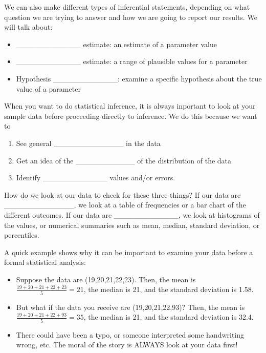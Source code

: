 \documentclass[]{book}
\providecommand{\tightlist}{%
  \setlength{\itemsep}{0pt}\setlength{\parskip}{0pt}}
\theoremstyle{definition}
\theoremstyle{definition}
\theoremstyle{remark}
\begin{document}
We can also make different types of inferential statements, depending on
what question we are trying to answer and how we are going to report our
results. We will talk about:

\begin{itemize}
\tightlist
\item
  \_\_\_\_\_\_\_\_\_\_\_\_ estimate: an estimate of a parameter value
  \vspace{.1in}
\item
  \_\_\_\_\_\_\_\_\_\_\_\_ estimate: a range of plausible values for a
  parameter \vspace{.1in}
\item
  Hypothesis \_\_\_\_\_\_\_\_\_\_\_\_: examine a specific hypothesis
  about the true value of a parameter
\end{itemize}

When you want to do statistical inference, it is always inportant to
look at your sample data before proceeding directly to inference. We do
this because we want to

\begin{enumerate}
\def\labelenumi{\arabic{enumi}.}
\tightlist
\item
  See general \_\_\_\_\_\_\_\_\_\_\_\_\_ in the data \vspace{.1in}
\item
  Get an idea of the \_\_\_\_\_\_\_\_\_\_\_ of the distribution of the
  data \vspace{.1in}
\item
  Identify \_\_\_\_\_\_\_\_\_\_\_\_ values and/or errors.
\end{enumerate}

How do we look at our data to check for these three things? If our data
are \_\_\_\_\_\_\_\_\_\_\_\_\_, we look at a table of frequencies or a
bar chart of the different outcomes. If our data are
\_\_\_\_\_\_\_\_\_\_\_\_, we look at histograms of the values, or
numerical summaries such as mean, median, standard deviation, or
percentiles.

A quick example shows why it can be important to examine your data
before a formal statistical analysis:

\begin{itemize}
\tightlist
\item
  Suppose the data are (19,20,21,22,23). Then, the mean is
  \(\frac{19+20+21+22+23}{5} = 21\), the median is 21, and the standard
  deviation is 1.58.
\item
  But what if the data you receive are (19,20,21,22,93)? Then, the mean
  is \(\frac{19+20+21+22+93}{5} = 35\), the median is 21, and the
  standard deviation is 32.4.
\item
  There could have been a typo, or someone interpreted some handwriting
  wrong, etc. The moral of the story is ALWAYS look at your data first!
\end{itemize}
\end{document}
